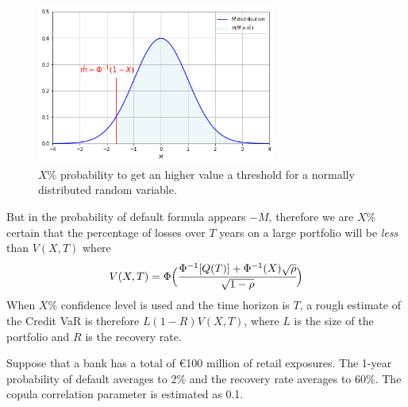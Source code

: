 \begin{figure}[htb]
	\centering
	\includegraphics[width=0.7\textwidth]{figures/certain_for_X.png}
	\caption{$X\%$ probability to get an higher value a threshold for a normally distributed random variable.}
	\label{fig:certain_for_X}
\end{figure} 
But in the probability of default formula appears $-M$, therefore we are $X\%$ certain that the percentage of losses over $T$ years on a large portfolio will be \emph{less} than $V(X,T)$ where
\[
V(X,T)=\Phi\Big(\cfrac{\Phi^{-1}[Q(T)]+\Phi^{-1}(X)\sqrt{\rho}}{\sqrt{1-\rho}}\Big)
\]
When $X\%$ confidence level is used and the time horizon is $T$, a rough estimate of the Credit VaR is therefore $L(1-R)V(X,T)$, where $L$ is the size of the portfolio and $R$ is the recovery rate.

Suppose that a bank has a total of \euro{100} million of retail exposures. The 1-year probability of default averages to 2\% and the recovery rate averages to 60\%. The copula correlation parameter is estimated as 0.1.


